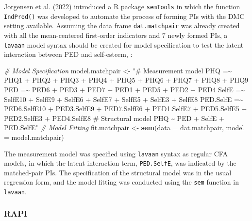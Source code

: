 \documentclass[
  man]{apa7}
\newenvironment{Shaded}{\begin{snugshade}}{\end{snugshade}}
\newcommand{\AttributeTok}[1]{\textcolor[rgb]{0.13,0.29,0.53}{#1}}
\newcommand{\CommentTok}[1]{\textcolor[rgb]{0.56,0.35,0.01}{\textit{#1}}}
\newcommand{\FunctionTok}[1]{\textcolor[rgb]{0.13,0.29,0.53}{\textbf{#1}}}
\newcommand{\NormalTok}[1]{#1}
\newcommand{\OtherTok}[1]{\textcolor[rgb]{0.56,0.35,0.01}{#1}}
\newcommand{\StringTok}[1]{\textcolor[rgb]{0.31,0.60,0.02}{#1}}
\begin{document}
Jorgensen et al. (2022) introduced a R package \texttt{semTools} in which the function \texttt{IndProd()} was developed to automate the process of forming PIs with the DMC setting available. Assuming the data frame \texttt{dat.matchpair} was already created with all the mean-centered first-order indicators and 7 newly formed PIs, a \texttt{lavaan} model syntax should be created for model specification to test the latent interaction between PED and self-esteem, :

\begin{Shaded}
\begin{Highlighting}[]
\CommentTok{\# Model Specification}
\NormalTok{model.matchpair }\OtherTok{\textless{}{-}} \StringTok{"\# Measurement model}
\StringTok{                      PHQ =\textasciitilde{} PHQ1 + PHQ2 + PHQ3 + PHQ4 + PHQ5 + }
\StringTok{                             PHQ6 + PHQ7 + PHQ8 + PHQ9}
\StringTok{                      PED =\textasciitilde{} PED6 + PED3 + PED7 + PED1 + }
\StringTok{                             PED5 + PED2 + PED4}
\StringTok{                      SelfE =\textasciitilde{} SelfE10 + SelfE9 + SelfE6 + SelfE7 + }
\StringTok{                               SelfE5 + SelfE3 + SelfE8}
\StringTok{                      PED.SelfE =\textasciitilde{} PED6.SelfE10 + PED3.SelfE9 + PED7.SelfE6 + }
\StringTok{                                   PED1.SelfE7 + PED5.SelfE5 + PED2.SelfE3 + }
\StringTok{                                   PED4.SelfE8}
\StringTok{                    \# Structural model}
\StringTok{                      PHQ \textasciitilde{} PED + SelfE + PED.SelfE"}
\CommentTok{\# Model Fitting}
\NormalTok{fit.matchpair }\OtherTok{\textless{}{-}} \FunctionTok{sem}\NormalTok{(}\AttributeTok{data =}\NormalTok{ dat.matchpair,}
                     \AttributeTok{model =}\NormalTok{ model.matchpair)}
\end{Highlighting}
\end{Shaded}

The measurement model was specified using \texttt{lavaan} syntax as regular CFA models, in which the latent interaction term, \texttt{PED.SelfE}, was indicated by the matched-pair PIs. The specification of the structural model was in the usual regression form, and the model fitting was conducted using the \texttt{sem} function in \texttt{lavaan}.

\hypertarget{rapi}{%
\subsubsection{RAPI}\label{rapi}}
\end{document}
